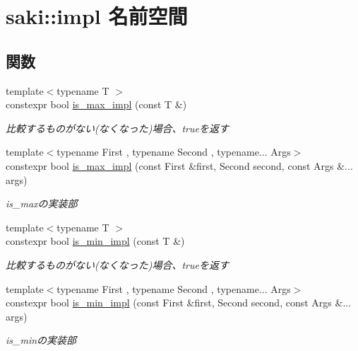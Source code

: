 \hypertarget{namespacesaki_1_1impl}{}\section{saki\+:\+:impl 名前空間}
\label{namespacesaki_1_1impl}
\subsection*{関数}
\begin{DoxyCompactItemize}
\item 
{\footnotesize template$<$typename T $>$ }\\constexpr bool \mbox{\hyperlink{namespacesaki_1_1impl_a1eb562842d6a5bcde39a463f04755157}{is\+\_\+max\+\_\+impl}} (const T \&)
\begin{DoxyCompactList}\small\item\em 比較するものがない(なくなった)場合、trueを返す \end{DoxyCompactList}\item 
{\footnotesize template$<$typename First , typename Second , typename... Args$>$ }\\constexpr bool \mbox{\hyperlink{namespacesaki_1_1impl_aa2d9e924789f49e245eca3d8fa7a57ed}{is\+\_\+max\+\_\+impl}} (const First \&first, Second second, const Args \&... args)
\begin{DoxyCompactList}\small\item\em is\+\_\+maxの実装部 \end{DoxyCompactList}\item 
{\footnotesize template$<$typename T $>$ }\\constexpr bool \mbox{\hyperlink{namespacesaki_1_1impl_ac84f4d7f2170d7090fc5e9fb79c21b7f}{is\+\_\+min\+\_\+impl}} (const T \&)
\begin{DoxyCompactList}\small\item\em 比較するものがない(なくなった)場合、trueを返す \end{DoxyCompactList}\item 
{\footnotesize template$<$typename First , typename Second , typename... Args$>$ }\\constexpr bool \mbox{\hyperlink{namespacesaki_1_1impl_ad6976cd10062dbcffec09620629f16bd}{is\+\_\+min\+\_\+impl}} (const First \&first, Second second, const Args \&... args)
\begin{DoxyCompactList}\small\item\em is\+\_\+minの実装部 \end{DoxyCompactList}\item 

\end{DoxyCompactItemize}
